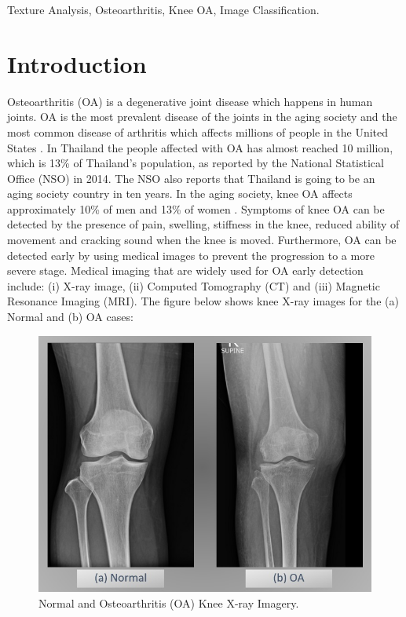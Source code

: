 \documentclass[review]{elsarticle}
\begin{document}
\begin{frontmatter}
\begin{keyword}
Texture Analysis, Osteoarthritis, Knee OA, Image Classification.
\end{keyword}

\end{frontmatter}

\linenumbers

\section{Introduction}

Osteoarthritis (OA) is a degenerative joint disease which happens in human joints. OA is the most prevalent disease of the joints in the aging society and the most common disease of arthritis which affects millions of people in the United States \cite{Factors2000}. In Thailand the people affected with OA has almost reached 10 million, which is 13\% of Thailand's population, as reported by the National Statistical Office (NSO) in 2014. The NSO also reports that Thailand is going to be an aging society country in ten years. In the aging society, knee OA affects approximately 10\% of men and 13\% of women \cite{BoneandJointInitiativeUSA2014}. Symptoms of knee OA can be detected by the presence of pain, swelling, stiffness in the knee, reduced ability of movement and cracking sound when the knee is moved. Furthermore, OA can be detected early by using medical images to prevent the progression to a more severe stage. Medical imaging that are widely used for OA early detection include: (i) X-ray image, (ii) Computed Tomography (CT) and (iii) Magnetic Resonance Imaging (MRI). The figure below shows knee X-ray images for the (a) Normal and (b) OA cases: \\
\begin{figure}[h]
	\centering
	\includegraphics[width=0.7\linewidth]{pic/picOA}
	\caption{Normal and Osteoarthritis (OA) Knee X-ray Imagery.}
	\label{fig:picoa}
\end{figure}
\end{document}
